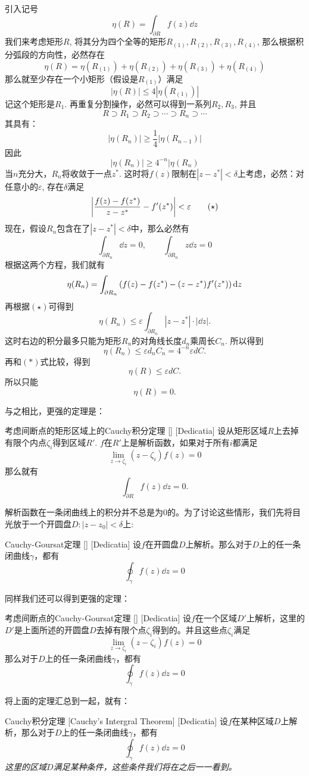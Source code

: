 \documentclass[UTF8]{ctexart}
\begin{document}
\begin{prf}
    引入记号
    \[\eta(R)=\int_{\partial R}f(z)\dd{z}\]
    我们来考虑矩形$R$, 将其分为四个全等的矩形$R_{(1)}, R_{(2)}, R_{(3)}, R_{(4)}$, 那么根据积分弧段的方向性，必然存在
    \[\eta(R)=\eta(R_{(1)})+\eta(R_{(2)})+\eta(R_{(3)})+\eta(R_{(4)})\]
    那么就至少存在一个小矩形（假设是$R_{(1)}$）满足
    \[|\eta(R)|\leqslant 4|\eta(R_{(1)})|\]
    记这个矩形是$R_1$. 再重复分割操作，必然可以得到一系列$R_2, R_3$, 并且
    \[R\supset R_1\supset R_2\supset\cdots\supset R_n\supset\cdots\]
    其具有：
    \[|\eta(R_n)|\geqslant \frac{1}{4}|\eta(R_{n-1})|\]
    因此
    \[|\eta(R_n)|\geqslant 4^{-n}|\eta(R_n)\tag{$\ast$}\]
    当$n$充分大，$R_n$将收敛于一点$z^*$. 这时将$f(z)$限制在$|z-z^*|<\delta $上考虑，必然：对任意小的$\varepsilon$, 存在$\delta$满足
    \[\vqty{\frac{f(z)-f(z^*)}{z-z^*}-f'(z^*)}<\varepsilon\tag{$\star$}\]
    现在，假设$R_n$包含在了$|z-z^*|<\delta$中，那么必然有
    \[\int_{\partial R_n}\dd{z}=0,\qquad\int_{\partial R_n}z\dd{z}=0\]
    根据这两个方程，我们就有
    \[\eta(R_n)=\int_{\partial R_n}\pqty{f(z)-f(z^*)-(z-z^*)f'(z^*)}\dd{z}\]
    再根据$(\star)$可得到
    \[\eta(R_n)\leqslant\varepsilon\int_{\partial R_n}|z-z^*|\cdot|\dd z|. \]
    这时右边的积分最多只能为矩形$R_n$的对角线长度$d_n$乘周长$C_n$. 所以得到
    \[\eta(R_n)\leqslant\varepsilon d_nC_n=4^{-n}\varepsilon dC.\]
    再和$(\ast)$式比较，得到
    \[\eta(R)\leqslant\varepsilon dC.\]
    所以只能
    \[\eta(R)=0.\]
\end{prf}
与之相比，更强的定理是：
\begin{thm}
    [UUID]
    {考虑间断点的矩形区域上的Cauchy积分定理}
    []
    [Dedicatia]
    设从矩形区域$R$上去掉有限个内点$\zeta_i$得到区域$R'$. $f$在$R'$上是解析函数，如果对于所有$i$都满足
    \[\lim_{z\to\zeta_i }(z-\zeta_i)f(z)=0\]
    那么就有
    \[\int_{\partial R}f(z)\dd{z}=0.\]
\end{thm}
解析函数在一条闭曲线上的积分并不总是为0的。为了讨论这些情形，我们先将目光放于一个开圆盘$D: |z-z_0|<\delta $上:
\begin{thm}
    [UUID]
    {Cauchy-Goursat定理}
    []
    [Dedicatia]
    设$f$在开圆盘$D$上解析。那么对于$D$上的任一条闭曲线$\gamma$，都有
    \[\oint_\gamma f(z)\dd{z}=0\]
\end{thm}
同样我们还可以得到更强的定理：
\begin{thm}
    [UUID]
    {考虑间断点的Cauchy-Goursat定理}
    []
    [Dedicatia]
    设$f$在一个区域$D'$上解析，这里的$D'$是上面所述的开圆盘$D$去掉有限个点$\zeta_i$得到的。并且这些点$\zeta_i$满足
    \[\lim_{z\to\zeta_i }(z-\zeta_i)f(z)=0\]
    那么对于$D$上的任一条闭曲线$\gamma$，都有
    \[\oint_\gamma f(z)\dd{z}=0\]
\end{thm}
将上面的定理汇总到一起，就有：
\begin{thm}
    [UUID]
    {Cauchy积分定理\label{thm:Cauchy}}
    [Cauchy's Intergral Theorem]
    [Dedicatia]
    设$f$在某种区域$D$上解析，那么对于$D$上的任一条闭曲线$\gamma$，都有
    \[\oint_\gamma f(z)\dd{z}=0\]
    \textit{这里的区域$D$满足某种条件，这些条件我们将在之后一一看到。}
\end{thm}
\end{document}
